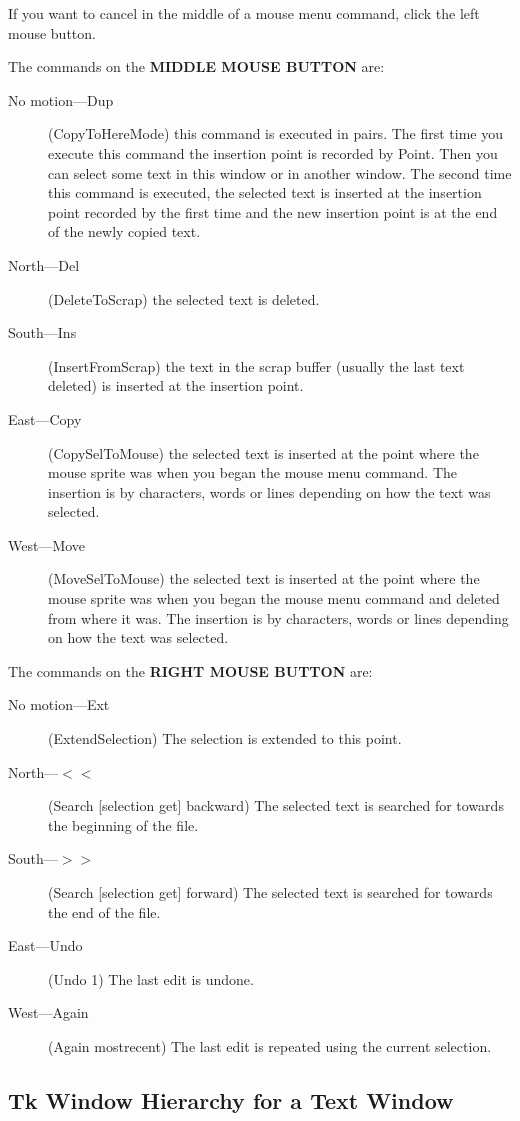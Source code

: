 If you want to cancel in the middle of a mouse menu command,
click the left mouse button.

The commands on the {\bf MIDDLE MOUSE BUTTON} are:
\begin{description}
\item[No motion---Dup] (CopyToHereMode) this command is executed in pairs.
	The first time you execute this command the insertion point is
	recorded by Point.
	Then you can select some text in this window or in another window.
	The second time this command is executed, the selected text
	is inserted at the insertion point recorded by the first time
	and the new insertion point is at the end of the newly copied text.
\item[North---Del] (DeleteToScrap) the selected text is deleted.
\item[South---Ins] (InsertFromScrap) the text in the scrap buffer (usually
	the last text deleted) is inserted at the insertion point.
\item[East---Copy] (CopySelToMouse) the selected text is inserted at the
	point where the mouse sprite was when you began the mouse menu command.
	The insertion is by characters, words or lines depending on how
	the text was selected.
\item[West---Move] (MoveSelToMouse) the selected text is inserted at the
	point where the mouse sprite was when you began the mouse menu
	command and deleted from where it was.
	The insertion is by characters, words or lines depending on how
	the text was selected.
\end{description}

The commands on the {\bf RIGHT MOUSE BUTTON} are:
\begin{description}
\item[No motion---Ext] (ExtendSelection)
	The selection is extended to this point.
\item[North---$<<$] (Search [selection get] backward)
	The selected text is searched for towards the beginning of the file.
\item[South---$>>$] (Search [selection get] forward)
	The selected text is searched for towards the end of the file.
\item[East---Undo] (Undo 1) The last edit is undone.
\item[West---Again] (Again mostrecent)
	The last edit is repeated using the current selection.
\end{description}


\subsection{ Tk Window Hierarchy for a Text Window}

